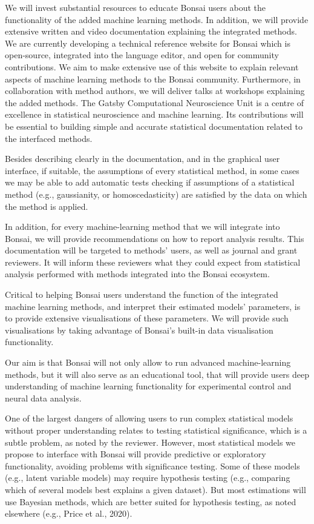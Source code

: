 \documentclass[11pt]{letter}
\begin{document}
\begin{letter}{
}
We will invest substantial resources to educate Bonsai users about the
functionality of the added machine learning methods. In addition, we will
provide extensive written and video documentation explaining the integrated
methods. We are currently developing a technical reference  website for Bonsai
which is open-source, integrated into the language editor, and open for
community contributions. We aim to make extensive use of this website to
explain relevant aspects of machine learning methods to the Bonsai community.
Furthermore, in collaboration with method authors, we will deliver talks at
workshops explaining the added methods.
%
The Gatsby Computational Neuroscience Unit is a centre of excellence in
statistical neuroscience and machine learning. Its contributions will be
essential to building simple and accurate statistical documentation related to
the interfaced methods.

Besides describing clearly in the documentation, and in the graphical user
interface, if suitable, the assumptions of every statistical method, in some
cases we may be able to add automatic tests checking if assumptions of a
statistical method (e.g., gaussianity, or homoscedasticity) are satisfied by the
data on which the method is applied.

In addition, for every machine-learning method that we will integrate into
Bonsai, we will provide recommendations on how to report analysis results.
This documentation will be targeted to methods' users, as well as journal and
grant reviewers. It will inform these reviewers what they could expect from
statistical analysis performed with methods integrated into the Bonsai
ecosystem.

Critical to helping Bonsai users understand the function of the integrated
machine learning methods, and interpret their estimated models' parameters, is
to provide extensive visualisations of these parameters. We will provide such
visualisations by taking advantage of Bonsai's built-in data visualisation
functionality.

Our aim is that Bonsai will not only allow to run advanced machine-learning
methods, but it will also serve as an educational tool, that will provide users
deep understanding of machine learning functionality for experimental control
and neural data analysis.

One of the largest dangers of allowing users to run complex statistical models
without proper understanding relates to testing statistical significance, which
is a subtle problem, as noted by the reviewer.
%
However, most statistical models we propose to interface with Bonsai will
provide predictive or exploratory functionality, avoiding problems with
significance testing.
%
Some of these models (e.g., latent variable models) may require hypothesis
testing (e.g., comparing which of several models best explains a given
dataset). But most estimations will use Bayesian methods, which are better
suited for hypothesis testing, as noted elsewhere (e.g., Price et al., 2020).


\end{letter}
\end{document}
